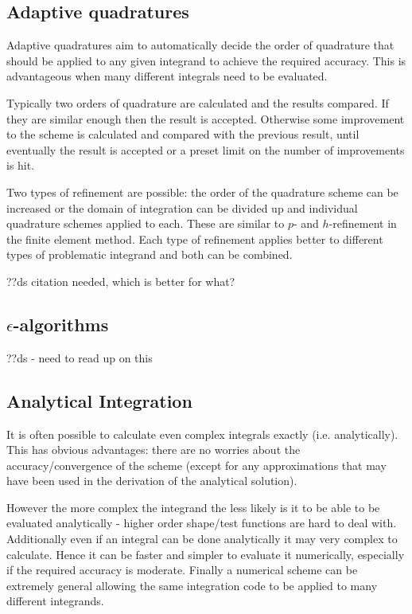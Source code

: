 \subsection{Adaptive quadratures}

Adaptive quadratures aim to automatically decide the order of quadrature that should be applied to any given integrand to achieve the required accuracy.
This is advantageous when many different integrals need to be evaluated.

Typically two orders of quadrature are calculated and the results compared.
If they are similar enough then the result is accepted.
Otherwise some improvement to the scheme is calculated and compared with the previous result, until eventually the result is accepted or a preset limit on the number of improvements is hit.

Two types of refinement are possible: the order of the quadrature scheme can be increased or the domain of integration can be divided up and individual quadrature schemes applied to each.
These are similar to $p$- and $h$-refinement in the finite element method.
Each type of refinement applies better to different types of problematic integrand and both can be combined.

??ds citation needed, which is better for what?

\subsection{$\epsilon$-algorithms}
??ds - need to read up on this

\subsection{Analytical Integration}

It is often possible to calculate even complex integrals exactly (i.e. analytically).
This has obvious advantages: there are no worries about the accuracy/convergence of the scheme (except for any approximations that may have been used in the derivation of the analytical solution).

However the more complex the integrand the less likely is it to be able to be evaluated analytically - higher order shape/test functions are hard to deal with.
Additionally even if an integral can be done analytically it may very complex to calculate. Hence it can be faster and simpler to evaluate it numerically, especially if the required accuracy is moderate.
Finally a numerical scheme can be extremely general allowing the same integration code to be applied to many different integrands.

